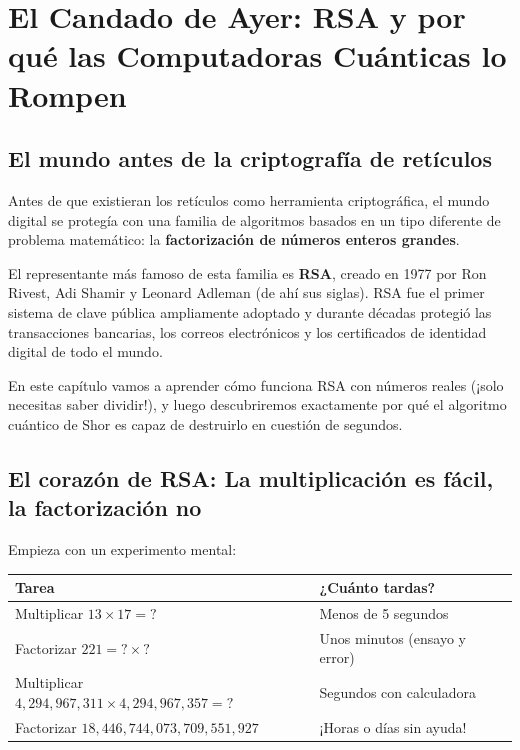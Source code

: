 \chapter{El Candado de Ayer: RSA y por qué las Computadoras Cuánticas lo Rompen}
\label{cap:rsa_y_shor}

\section{El mundo antes de la criptografía de retículos}

Antes de que existieran los retículos como herramienta criptográfica, el mundo digital se protegía con una familia de algoritmos basados en un tipo diferente de problema matemático: la \textbf{factorización de números enteros grandes}.

El representante más famoso de esta familia es \textbf{RSA}, creado en 1977 por Ron Rivest, Adi Shamir y Leonard Adleman (de ahí sus siglas). RSA fue el primer sistema de clave pública ampliamente adoptado y durante décadas protegió las transacciones bancarias, los correos electrónicos y los certificados de identidad digital de todo el mundo.

En este capítulo vamos a aprender cómo funciona RSA con números reales (¡solo necesitas saber dividir!), y luego descubriremos exactamente por qué el algoritmo cuántico de Shor es capaz de destruirlo en cuestión de segundos.

\section{El corazón de RSA: La multiplicación es fácil, la factorización no}

Empieza con un experimento mental:

\begin{center}
\begin{tabular}{ll}
\toprule
\textbf{Tarea} & \textbf{¿Cuánto tardas?} \\
\midrule
Multiplicar $13 \times 17 = ?$ & Menos de 5 segundos \\
Factorizar $221 = ? \times ?$ & Unos minutos (ensayo y error) \\
Multiplicar $4{,}294{,}967{,}311 \times 4{,}294{,}967{,}357 = ?$ & Segundos con calculadora \\
Factorizar $18{,}446{,}744{,}073{,}709{,}551{,}927$ & ¡Horas o días sin ayuda! \\
\bottomrule
\end{tabular}
\end{center}

